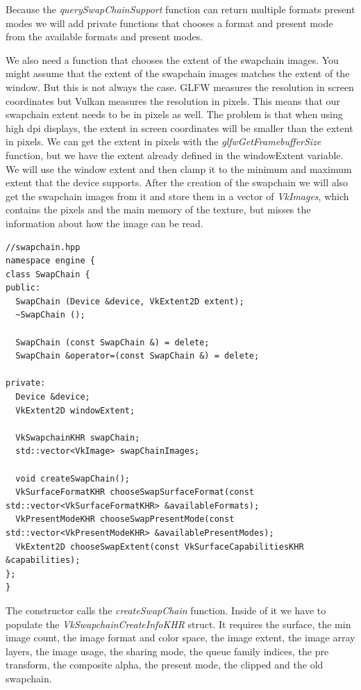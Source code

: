 \documentclass[12pt]{report} \usepackage{preamble}
\begin{document}
Because the \textit{querySwapChainSupport} function can return multiple formats present \\
modes we will add private functions that chooses a format and present mode from
the available formats and present modes.

We also need a function that chooses the extent of the swapchain images. You might assume that the extent of the
swapchain images matches the extent of the window. But this is not always the case. \ac{GLFW} measures the resolution
in screen coordinates but Vulkan measures the resolution in pixels. This means that our swapchain extent needs
to be in pixels as well. The problem is that when using high dpi displays, the extent in screen coordinates
will be smaller than the extent in pixels. We can get the extent in pixels with the \textit{glfwGetFramebufferSize}
function, but we have the extent already defined in the windowExtent variable. We will use the window extent
and then clamp it to the minimum and maximum extent that the device supports.
After the creation of the swapchain we will also get the swapchain images from it and store them in a vector of
\textit{VkImages}, which contains the pixels and the main memory of the texture, but misses the information about
how the image can be read.

\begin{lstlisting}[Language=C++]
//swapchain.hpp
namespace engine {
class SwapChain {
public:
  SwapChain (Device &device, VkExtent2D extent);
  ~SwapChain ();

  SwapChain (const SwapChain &) = delete;
  SwapChain &operator=(const SwapChain &) = delete;

private:
  Device &device;
  VkExtent2D windowExtent;

  VkSwapchainKHR swapChain;
  std::vector<VkImage> swapChainImages;

  void createSwapChain();
  VkSurfaceFormatKHR chooseSwapSurfaceFormat(const std::vector<VkSurfaceFormatKHR> &availableFormats);
  VkPresentModeKHR chooseSwapPresentMode(const std::vector<VkPresentModeKHR> &availablePresentModes);
  VkExtent2D chooseSwapExtent(const VkSurfaceCapabilitiesKHR &capabilities);
};
}

\end{lstlisting}

The constructor calls the \textit{createSwapChain} function. Inside of it we have
to populate the \textit{VkSwapchainCreateInfoKHR} struct. It requires the surface,
the min image count, the image format and color space, the image extent, the image
array layers, the image usage, the sharing mode, the queue family indices, the
pre transform, the composite alpha, the present mode, the clipped and the old swapchain.
\end{document}
